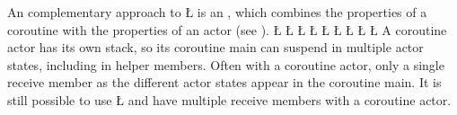 \documentclass[openright,twoside]{report}
\begin{document}
An complementary approach to \LGinlinetrue\LGbegin\lgrinde\L{}\endlgrinde\LGend{} is an , which combines the properties of a coroutine with the properties of an actor (see ).
\LGinlinefalse\LGbegin\lgrinde
\L{}
\L{\LB{}}
\CE{}\L{\LB{}}
\L{\LB{}}
\L{\LB{}}
\L{\LB{}}
\CE{}\L{\LB{}}
\CE{}\L{\LB{}}
\L{\LB{\};}}
\endlgrinde\LGend
A coroutine actor has its own stack, so its coroutine main can suspend in multiple actor states, including in helper members.
Often with a coroutine actor, only a single receive member as the different actor states appear in the coroutine main.
It is still possible to use \LGinlinetrue\LGbegin\lgrinde\L{}\endlgrinde\LGend{} and have multiple receive members with a coroutine actor.
\end{document}
